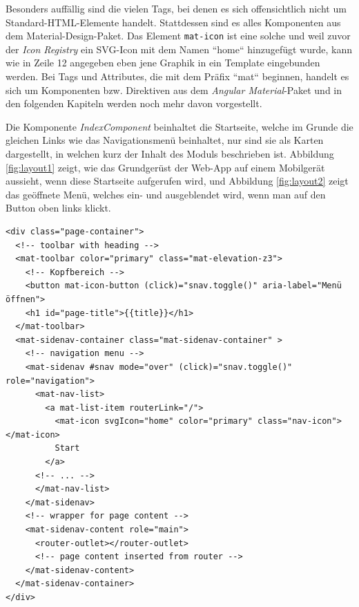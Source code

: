 Besonders auffällig sind die vielen Tags, bei denen es sich offensichtlich nicht um Standard-\acs{HTML}-Elemente handelt. Stattdessen sind es alles Komponenten aus dem Material-Design-Paket. Das Element \texttt{mat-icon} ist eine solche und weil zuvor der \textit{Icon Registry} ein SVG-Icon mit dem Namen ``home`` hinzugefügt wurde, kann wie in Zeile 12 angegeben eben jene Graphik in ein Template eingebunden werden. Bei Tags und Attributes, die mit dem Präfix ``mat`` beginnen, handelt es sich um Komponenten bzw. Direktiven aus dem \textit{Angular Material}-Paket und in den folgenden Kapiteln werden noch mehr davon vorgestellt.

Die Komponente \textit{IndexComponent} beinhaltet die Startseite, welche im Grunde die gleichen Links wie das Navigationsmenü beinhaltet, nur sind sie als Karten dargestellt, in welchen kurz der Inhalt des Moduls beschrieben ist. Abbildung \ref{fig:layout1} zeigt, wie das Grundgerüst der Web-App auf einem Mobilgerät aussieht, wenn diese Startseite aufgerufen wird, und Abbildung \ref{fig:layout2} zeigt das geöffnete Menü, welches ein- und ausgeblendet wird, wenn man auf den Button oben links klickt.

\begin{lstlisting}[float, floatplacement=h, style=htmlcssjs, caption={Ausschnitt aus \texttt{app.component.hmtl} (Quelle: \href{https://material.angular.io/components/sidenav/examples}{https://material.angular.io/components/sidenav/examples})}, label={app.component.html}]
<div class="page-container">
  <!-- toolbar with heading -->
  <mat-toolbar color="primary" class="mat-elevation-z3">
    <!-- Kopfbereich -->
    <button mat-icon-button (click)="snav.toggle()" aria-label="Menü öffnen">
    <h1 id="page-title">{{title}}</h1>
  </mat-toolbar>
  <mat-sidenav-container class="mat-sidenav-container" >
    <!-- navigation menu -->
    <mat-sidenav #snav mode="over" (click)="snav.toggle()" role="navigation">
      <mat-nav-list>
        <a mat-list-item routerLink="/">
          <mat-icon svgIcon="home" color="primary" class="nav-icon"></mat-icon>
          Start
        </a>
	  <!-- ... -->
	  </mat-nav-list>
	</mat-sidenav>
    <!-- wrapper for page content -->
    <mat-sidenav-content role="main">
      <router-outlet></router-outlet>
      <!-- page content inserted from router -->
    </mat-sidenav-content>
  </mat-sidenav-container>
</div>
\end{lstlisting}

